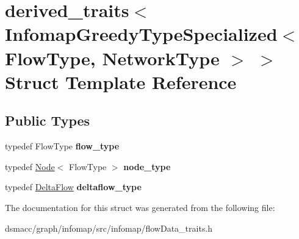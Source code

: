 \hypertarget{structderived__traits_3_01InfomapGreedyTypeSpecialized_3_01FlowType_00_01NetworkType_01_4_01_4}{}\section{derived\+\_\+traits$<$ Infomap\+Greedy\+Type\+Specialized$<$ Flow\+Type, Network\+Type $>$ $>$ Struct Template Reference}
\label{structderived__traits_3_01InfomapGreedyTypeSpecialized_3_01FlowType_00_01NetworkType_01_4_01_4}
\subsection*{Public Types}
\begin{DoxyCompactItemize}
\item 
\mbox{\label{structderived__traits_3_01InfomapGreedyTypeSpecialized_3_01FlowType_00_01NetworkType_01_4_01_4_a09832ea5c04af1de166471af7ae82d8d}} 
typedef Flow\+Type {\bfseries flow\+\_\+type}
\item 
\mbox{\label{structderived__traits_3_01InfomapGreedyTypeSpecialized_3_01FlowType_00_01NetworkType_01_4_01_4_aec13aead68f97b93adab3ecb44e51465}} 
typedef \mbox{\hyperlink{classNode}{Node}}$<$ Flow\+Type $>$ {\bfseries node\+\_\+type}
\item 
\mbox{\label{structderived__traits_3_01InfomapGreedyTypeSpecialized_3_01FlowType_00_01NetworkType_01_4_01_4_a30cdb893ea3d6e809661ad7169ad1756}} 
typedef \mbox{\hyperlink{structDeltaFlow}{Delta\+Flow}} {\bfseries deltaflow\+\_\+type}
\end{DoxyCompactItemize}


The documentation for this struct was generated from the following file\+:\begin{DoxyCompactItemize}
\item 
dsmacc/graph/infomap/src/infomap/flow\+Data\+\_\+traits.\+h\end{DoxyCompactItemize}
